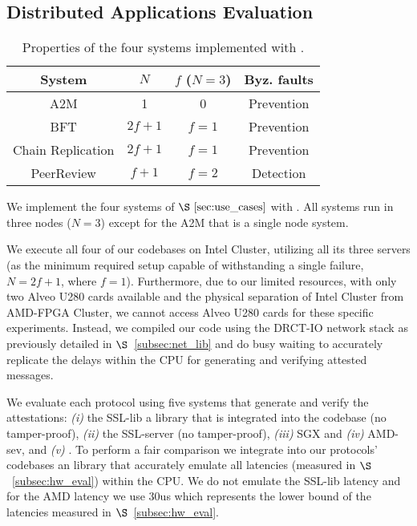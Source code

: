 \subsection{Distributed Applications Evaluation}
\label{subsec:use_cases_eval}

\begin{table}
\begin{center}
\small
\begin{tabular}{ |c|c|c|c| } 
 \hline
 System & $N$ & $f$ ($N=3$) & Byz. faults \\ [0.5ex] \hline \hline
 A2M    & 1 & 0 & Prevention\\
 BFT &  $2f+1$ & $f=1$ & Prevention\\
 Chain Replication &  $2f+1$ & $f=1$ & Prevention\\
 PeerReview & $f+1$ & $f=2$ & Detection\\
 \hline
\end{tabular}
\end{center}
\caption{Properties of the four systems implemented with \projecttitle{}.}
\label{tab:use_cases_options}
\end{table}
\fi
We implement the four systems of $\S~\ref{sec:use_cases}$ with \projecttitle{}. All systems run in three nodes ($N=3$) except for the A2M that is a single node system.

 We execute all four of our codebases on Intel Cluster, utilizing all its three servers (as the minimum required setup capable of withstanding a single failure, $N=2f+1$, where $f=1$). Furthermore, due to our limited resources, with only two Alveo U280 cards available and the physical separation of Intel Cluster from AMD-FPGA Cluster, we cannot access Alveo U280 cards for these specific experiments. Instead, we compiled our code using the DRCT-IO network stack as previously detailed in $\S$~\ref{subsec:net_lib} and do busy waiting to accurately replicate the \projecttitle{} delays within the CPU for generating and verifying attested messages.%

We evaluate each protocol using five systems that generate and verify the attestations: {\em (i)} the SSL-lib a library that is integrated into the codebase (no tamper-proof), {\em (ii)} the SSL-server (no tamper-proof), {\em (iii)} SGX and {\em (iv)} AMD-sev, and {\em (v)} \projecttitle{}. To perform a fair comparison we integrate into our protocols' codebases an library that accurately emulate all latencies (measured in $\S$~\ref{subsec:hw_eval}) within the CPU. We do not emulate the SSL-lib latency and for the AMD latency we use 30us which represents the lower bound of the latencies measured in $\S$~\ref{subsec:hw_eval}.


